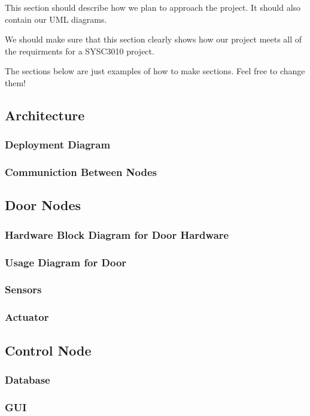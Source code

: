 This section should describe how we plan to approach the project. It should also
contain our UML diagrams. 

We should make sure that this section clearly shows how our project meets all of
the requirments for a SYSC3010 project.

The sections below are just examples of how to make sections. Feel free to
change them!

\subsection{Architecture}

\subsubsection{Deployment Diagram}

\subsubsection{Communiction Between Nodes}

\subsection{Door Nodes}

\subsubsection{Hardware Block Diagram for Door Hardware}

\subsubsection{Usage Diagram for Door}

\subsubsection{Sensors}

\subsubsection{Actuator}

\subsection{Control Node}

\subsubsection{Database}

\subsubsection{GUI}


